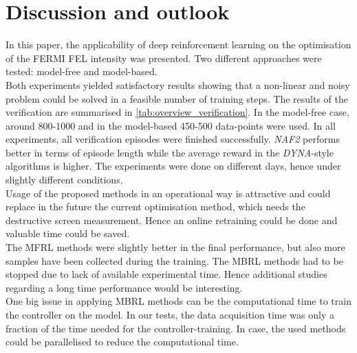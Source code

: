 \documentclass[
reprint,nofootinbib,
amsmath,amssymb,amsfonts,clevref,
aps,
prstab,
]{revtex4-2}
\begin{document}
	\section{Discussion and outlook}
	In this paper, the applicability of deep reinforcement learning on the optimisation of the FERMI FEL intensity was presented. Two different approaches were tested: model-free and model-based.\\
	Both experiments yielded satisfactory results showing that a non-linear and noisy problem could be solved in a feasible number of training steps. The results of the verification are summarised in \cref{tab:overview_verification}. In the model-free case, around 800-1000 and in the model-based 450-500 data-points were used. In all experiments, all verification episodes were finished successfully. \emph{NAF2} performs better in terms of episode length while the average reward in the \emph{DYNA}-style algorithms is higher. The experiments were done on different days, hence under slightly different conditions.\\
	Usage of the proposed methods in an operational way is attractive and could replace in the future the current optimisation method, which needs the destructive screen measurement. Hence an online retraining could be done and valuable time could be saved.\\ 
	The MFRL methods were slightly better in the final performance, but also more samples have been collected during the training. The MBRL methods had to be stopped due to lack of available experimental time. Hence additional studies regarding a long time performance would be interesting.\\ One big issue in applying MBRL methods can be the computational time to train the controller on the model. In our tests, the data acquisition time was only a fraction of the time needed for the controller-training. In case, the used methods could be parallelised to reduce the computational time.
\end{document}
